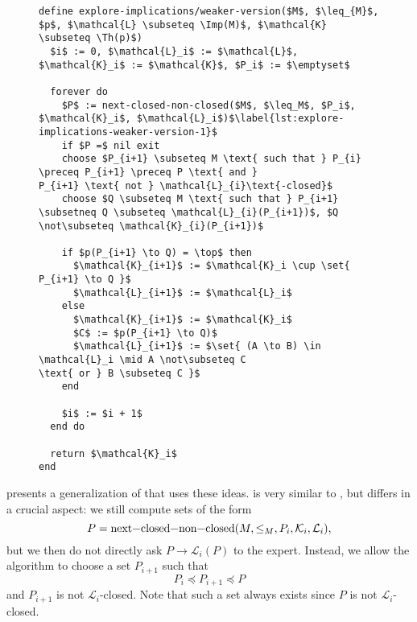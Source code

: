 \begin{figure}[tp]
  \begin{Algorithm}
    \label{alg:explore-implications-weaker-version}
    \hspace*{0cm}
\begin{lstlisting}
define explore-implications/weaker-version($M$, $\leq_{M}$, $p$, $\mathcal{L} \subseteq \Imp(M)$, $\mathcal{K} \subseteq \Th(p)$)
  $i$ := 0, $\mathcal{L}_i$ := $\mathcal{L}$, $\mathcal{K}_i$ := $\mathcal{K}$, $P_i$ := $\emptyset$

  forever do
    $P$ := next-closed-non-closed($M$, $\leq_M$, $P_i$, $\mathcal{K}_i$, $\mathcal{L}_i$)$\label{lst:explore-implications-weaker-version-1}$
    if $P =$ nil exit
    choose $P_{i+1} \subseteq M \text{ such that } P_{i} \preceq P_{i+1} \preceq P \text{ and }
P_{i+1} \text{ not } \mathcal{L}_{i}\text{-closed}$
    choose $Q \subseteq M \text{ such that } P_{i+1} \subsetneq Q \subseteq \mathcal{L}_{i}(P_{i+1})$, $Q \not\subseteq \mathcal{K}_{i}(P_{i+1})$

    if $p(P_{i+1} \to Q) = \top$ then
      $\mathcal{K}_{i+1}$ := $\mathcal{K}_i \cup \set{ P_{i+1} \to Q }$
      $\mathcal{L}_{i+1}$ := $\mathcal{L}_i$
    else
      $\mathcal{K}_{i+1}$ := $\mathcal{K}_i$
      $C$ := $p(P_{i+1} \to Q)$
      $\mathcal{L}_{i+1}$ := $\set{ (A \to B) \in \mathcal{L}_i \mid A \not\subseteq C
\text{ or } B \subseteq C }$
    end

    $i$ := $i + 1$
  end do

  return $\mathcal{K}_i$  
end
\end{lstlisting}
  \end{Algorithm}
\end{figure}

 presents a generalization of
 that uses these ideas.
 is very similar to
, but differs in a crucial aspect: we still compute sets of
the form
\begin{equation*}
  P = \text{\lstinline{next-closed-non-closed}}(M, \leq_{M}, P_{i}, \mathcal{K}_{i}, \mathcal{L}_{i}),
\end{equation*}
but we then do not directly ask $P \to \mathcal{L}_{i}(P)$ to the expert.  Instead, we
allow the algorithm to choose a set $P_{i+1}$ such that
\begin{equation*}
  P_{i} \preceq P_{i+1} \preceq P
\end{equation*}
and $P_{i+1}$ is not $\mathcal{L}_{i}$-closed.  Note that such a set always exists since
$P$ is not $\mathcal{L}_{i}$-closed.

